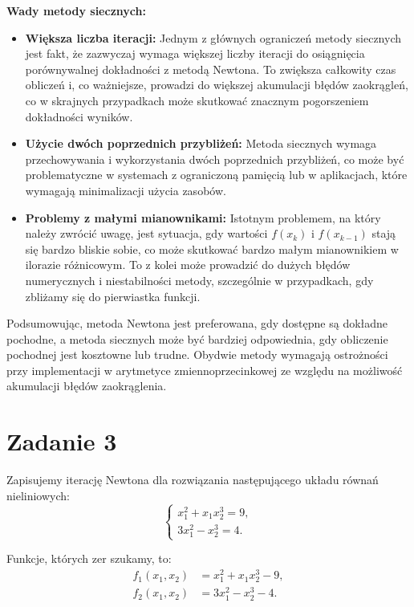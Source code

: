 \documentclass{article}
\begin{document}
\textbf{Wady metody siecznych:}
\begin{itemize}
    \item {\bf Większa liczba iteracji:} Jednym z głównych ograniczeń metody siecznych jest fakt, że zazwyczaj wymaga większej liczby iteracji do osiągnięcia porównywalnej dokładności z metodą Newtona. To zwiększa całkowity czas obliczeń i, co ważniejsze, prowadzi do większej akumulacji błędów zaokrągleń, co w skrajnych przypadkach może skutkować znacznym pogorszeniem dokładności wyników.
    \item {\bf Użycie dwóch poprzednich przybliżeń:} Metoda siecznych wymaga przechowywania i wykorzystania dwóch poprzednich przybliżeń, co może być problematyczne w systemach z ograniczoną pamięcią lub w aplikacjach, które wymagają minimalizacji użycia zasobów.
    \item {\bf Problemy z małymi mianownikami:} Istotnym problemem, na który należy zwrócić uwagę, jest sytuacja, gdy wartości \( f(x_k) \) i \( f(x_{k-1}) \) stają się bardzo bliskie sobie, co może skutkować bardzo małym mianownikiem w ilorazie różnicowym. To z kolei może prowadzić do dużych błędów numerycznych i niestabilności metody, szczególnie w przypadkach, gdy zbliżamy się do pierwiastka funkcji.
\end{itemize}

Podsumowując, metoda Newtona jest preferowana, gdy dostępne są dokładne pochodne, a metoda siecznych może być bardziej odpowiednia, gdy obliczenie pochodnej jest kosztowne lub trudne. Obydwie metody wymagają ostrożności przy implementacji w arytmetyce zmiennoprzecinkowej ze względu na możliwość akumulacji błędów zaokrąglenia.

\section*{Zadanie 3}

Zapisujemy iterację Newtona dla rozwiązania następującego układu równań nieliniowych:
\begin{equation*}
    \begin{cases}
    x_1^2 + x_1 x_2^3 = 9, \\
    3x_1^2 - x_2^3 = 4.
    \end{cases}
\end{equation*}

Funkcje, których zer szukamy, to:
\begin{align*}
    f_1(x_1, x_2) &= x_1^2 + x_1 x_2^3 - 9, \\
    f_2(x_1, x_2) &= 3x_1^2 - x_2^3 - 4.
\end{align*}
\end{document}
